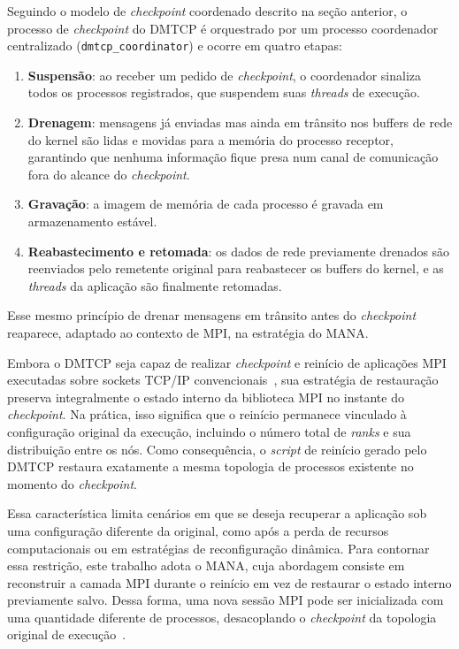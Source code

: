 Seguindo o modelo de \textit{checkpoint} coordenado descrito na seção anterior, o
processo de \textit{checkpoint} do DMTCP é orquestrado por um processo coordenador
centralizado (\texttt{dmtcp\_\allowbreak coordinator}) e ocorre em quatro etapas:

\begin{enumerate}
  \item \textbf{Suspensão}: ao receber um pedido de \textit{checkpoint}, o coordenador sinaliza
    todos os processos registrados, que suspendem suas \textit{threads} de execução.
  \item \textbf{Drenagem}: mensagens já enviadas mas ainda em trânsito nos buffers de
    rede do kernel são lidas e movidas para a memória do processo receptor, garantindo
    que nenhuma informação fique presa num canal de comunicação fora do alcance do
    \textit{checkpoint}.
  \item \textbf{Gravação}: a imagem de memória de cada processo é gravada em
    armazenamento estável.
  \item \textbf{Reabastecimento e retomada}: os dados de rede previamente drenados são
    reenviados pelo remetente original para reabastecer os buffers do kernel, e as
    \textit{threads} da aplicação são finalmente retomadas.
\end{enumerate}

Esse mesmo princípio de drenar mensagens em trânsito antes do \textit{checkpoint} reaparece,
adaptado ao contexto de MPI, na estratégia do MANA.

Embora o DMTCP seja capaz de realizar \textit{checkpoint} e reinício de aplicações MPI executadas
sobre sockets TCP/IP convencionais~\cite{ansel2009dmtcp}, sua estratégia de
restauração preserva integralmente o estado interno da biblioteca MPI no instante
do \textit{checkpoint}. Na prática, isso significa que o reinício permanece vinculado à configuração
original da execução, incluindo o número total de \textit{ranks} e sua distribuição
entre os nós. Como consequência, o \textit{script} de reinício gerado pelo DMTCP
restaura exatamente a mesma topologia de processos existente no momento do \textit{checkpoint}.

Essa característica limita cenários em que se deseja recuperar a aplicação
sob uma configuração diferente da original, como após a perda de recursos computacionais
ou em estratégias de reconfiguração dinâmica. Para contornar essa restrição,
este trabalho adota o MANA, cuja abordagem consiste em reconstruir a camada
MPI durante o reinício em vez de restaurar o estado interno previamente salvo.
Dessa forma, uma nova sessão MPI pode ser inicializada com uma quantidade diferente
de processos, desacoplando o \textit{checkpoint} da topologia original de execução~\cite{garg2019mana}.

